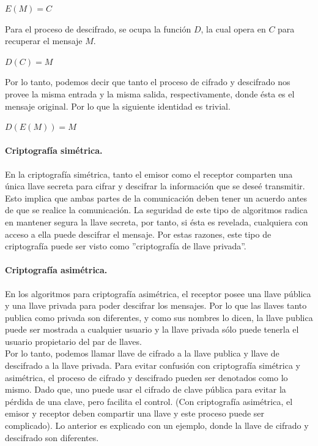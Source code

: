 \documentclass[12pt, a4paper, titlepage]{article}
\begin{document}
		\begin{center}
		    $E(M) = C$    
		\end{center}
		
		Para el proceso de descifrado, se ocupa la función $D$, la cual opera en $C$ para recuperar el mensaje $M$.
		
		\begin{center}
		    $D(C) = M$
		\end{center}
		
		Por lo tanto, podemos decir que tanto el proceso de cifrado y descifrado nos provee la misma entrada y la misma salida, respectivamente, donde ésta es el mensaje original. Por lo que la siguiente identidad es trivial.
		
		\begin{center}
		    $D(E(M)) = M$
		\end{center}
        \cite{refChaffing}
		\paragraph{Criptografía simétrica.\\}
	    En la criptografía simétrica, tanto el emisor como el receptor comparten una única llave secreta para cifrar y descifrar la información que se deseé transmitir. Esto implica que ambas partes de la comunicación deben tener un acuerdo antes de que se realice la comunicación. La seguridad de este tipo de algoritmos radica en mantener segura la llave secreta, por tanto, si ésta es revelada, cualquiera con acceso a ella puede descifrar el mensaje. Por estas razones, este tipo de criptografía puede ser visto como ''criptografía de llave privada''. \cite{refChaffing}
		\paragraph{Criptografía asimétrica.\\}
		En los algoritmos para criptografía asimétrica, el receptor posee una llave pública y una llave privada para poder descifrar los mensajes. Por lo que las llaves tanto publica como privada son diferentes, y como sus nombres lo dicen, la llave publica puede ser mostrada a cualquier usuario y la llave privada sólo puede tenerla el usuario propietario del par de llaves.\\
		Por lo tanto, podemos llamar llave de cifrado a la llave publica y llave de descifrado a la llave privada.
		Para evitar confusión con criptografía simétrica y asimétrica, el proceso de cifrado y descifrado pueden ser denotados como lo mismo. Dado que, uno puede usar el cifrado de clave pública para evitar la pérdida de una clave, pero facilita el control. (Con criptografía asimétrica, el emisor y receptor deben compartir una llave y este proceso puede ser complicado). Lo anterior es explicado con un ejemplo, donde la llave de cifrado y descifrado son diferentes.\cite{refChaffing}\\
		
\end{document}
